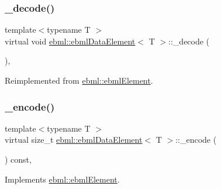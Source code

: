 \subsubsection{\texorpdfstring{\+\_\+decode()}{\_decode()}\hspace{0.1cm}{\footnotesize\ttfamily [2/2]}}
{\footnotesize\ttfamily template$<$typename T $>$ \\
virtual void \mbox{\hyperlink{classebml_1_1ebmlDataElement}{ebml\+::ebml\+Data\+Element}}$<$ T $>$\+::\+\_\+decode (\begin{DoxyParamCaption}\item[{const \mbox{\hyperlink{classebml_1_1parseFile}{parse\+File}} \&}]{ }\end{DoxyParamCaption})\hspace{0.3cm}{\ttfamily [protected]}, {\ttfamily [virtual]}}



Reimplemented from \mbox{\hyperlink{classebml_1_1ebmlElement_adf579591cece6b61d85cdb48861c3620}{ebml\+::ebml\+Element}}.

\mbox{\label{classebml_1_1ebmlDataElement_aabb10c15457709e0aa2c1f5744ddbfff}} 
\subsubsection{\texorpdfstring{\+\_\+encode()}{\_encode()}}
{\footnotesize\ttfamily template$<$typename T $>$ \\
virtual size\+\_\+t \mbox{\hyperlink{classebml_1_1ebmlDataElement}{ebml\+::ebml\+Data\+Element}}$<$ T $>$\+::\+\_\+encode (\begin{DoxyParamCaption}\item[{char $\ast$}]{ }\end{DoxyParamCaption}) const\hspace{0.3cm}{\ttfamily [protected]}, {\ttfamily [virtual]}}



Implements \mbox{\hyperlink{classebml_1_1ebmlElement_a27bd9de14e1706840235b68331917776}{ebml\+::ebml\+Element}}.

\mbox{\label{classebml_1_1ebmlDataElement_add3cc3627008b8139a054a3a0696bc2d}} 
